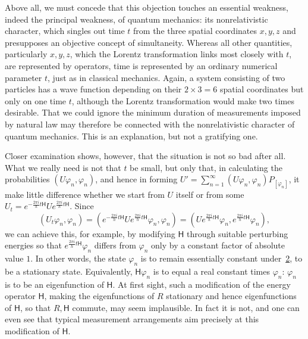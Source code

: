 \documentclass[fontsize=13pt,twoside,openany,headings=normal,parskip=false,bookmarkpackage=false,DIV=calc]{scrbook}
\begin{document}
Above all, we must concede that this objection touches an essential weakness, indeed the principal weakness, of quantum mechanics: its nonrelativistic character, which singles out time $t$ from the three spatial coordinates $x,y,z$ and presupposes an objective concept of simultaneity. Whereas all other quantities, particularly $x,y,z$, which the Lorentz transformation links most closely with $t$, are represented by operators, time is represented by an ordinary numerical parameter $t$, just as in classical mechanics. Again, a system consisting of two particles has a wave function depending on their $2\times3=6$ spatial coordinates but only on one time $t$, although the Lorentz transformation would make two times desirable. That we could ignore the minimum duration of measurements imposed by natural law may therefore be connected with the nonrelativistic character of quantum mechanics. This is an explanation, but not a gratifying one.

\hypertarget{origpage-189}{}%
Closer examination shows, however, that the situation is not so bad after all. What we really need is not that $t$ be small, but only that, in calculating the probabilities $(U\varphi_n,\varphi_n)$, and hence in forming $U'=\sum_{n=1}^{\infty}(U\varphi_n,\varphi_n)P_{[\varphi_n]}$, it make little difference whether we start from $U$ itself or from some $U_t=e^{-\frac{2\pi i}{h}t\mathsf{H}}Ue^{\frac{2\pi i}{h}t\mathsf{H}}$. Since
\[
(U_t\varphi_n,\varphi_n)
=\left(e^{-\frac{2\pi i}{h}t\mathsf{H}}Ue^{\frac{2\pi i}{h}t\mathsf{H}}\varphi_n,\varphi_n\right)
=\left(Ue^{\frac{2\pi i}{h}t\mathsf{H}}\varphi_n,e^{\frac{2\pi i}{h}t\mathsf{H}}\varphi_n\right),
\]
we can achieve this, for example, by modifying $\mathsf{H}$ through suitable perturbing energies so that $e^{\frac{2\pi i}{h}t\mathsf{H}}\varphi_n$ differs from $\varphi_n$ only by a constant factor of absolute value $1$. In other words, the state $\varphi_n$ is to remain essentially constant under~\hyperref[eq:V.1.2]{2}, to be a stationary state. Equivalently, $\mathsf{H}\varphi_n$ is to equal a real constant times $\varphi_n$: $\varphi_n$ is to be an eigenfunction of $\mathsf{H}$. At first sight, such a modification of the energy operator $\mathsf{H}$, making the eigenfunctions of $R$ stationary and hence eigenfunctions of $\mathsf{H}$, so that $R,\mathsf{H}$ commute, may seem implausible. In fact it is not, and one can even see that typical measurement arrangements aim precisely at this modification of $\mathsf{H}$.
\end{document}
